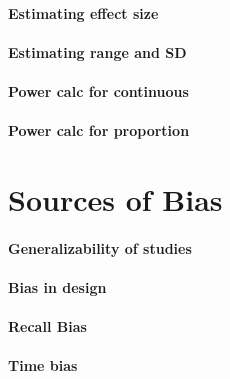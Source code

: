 \documentclass[]{book}
\theoremstyle{definition}
\theoremstyle{definition}
\theoremstyle{definition}
\theoremstyle{remark}
\begin{document}
\hypertarget{estimating-effect-size}{%
\subsubsection{Estimating effect size}\label{estimating-effect-size}}

\hypertarget{estimating-range-and-sd}{%
\subsubsection{Estimating range and SD}\label{estimating-range-and-sd}}

\hypertarget{power-calc-for-continuous}{%
\subsubsection{Power calc for
continuous}\label{power-calc-for-continuous}}

\hypertarget{power-calc-for-proportion}{%
\subsubsection{Power calc for
proportion}\label{power-calc-for-proportion}}

\hypertarget{sources-of-bias}{%
\chapter{Sources of Bias}\label{sources-of-bias}}

\hypertarget{generalizability-of-studies}{%
\subsubsection{Generalizability of
studies}\label{generalizability-of-studies}}

\hypertarget{bias-in-design}{%
\subsubsection{Bias in design}\label{bias-in-design}}

\hypertarget{recall-bias}{%
\subsubsection{Recall Bias}\label{recall-bias}}

\hypertarget{time-bias}{%
\subsubsection{Time bias}\label{time-bias}}
\end{document}
